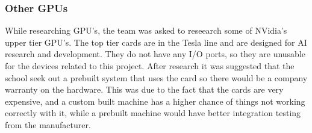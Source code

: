     \subsubsection*{Other GPUs}

        While researching GPU's, the team was asked to reseearch some of NVidia's upper tier GPU's.  The top tier cards are in the Tesla line and are designed for AI research and development.  They do not have any I/O ports, so they are unusable for the devices related to this project.  After research it was suggested that the school seek out a prebuilt system that uses the card so there would be a company warranty on the hardware.  This was due to the fact that the cards are very expensive, and a custom built machine has a higher chance of things not working correctly with it, while a prebuilt machine would have better integration testing from the manufacturer.